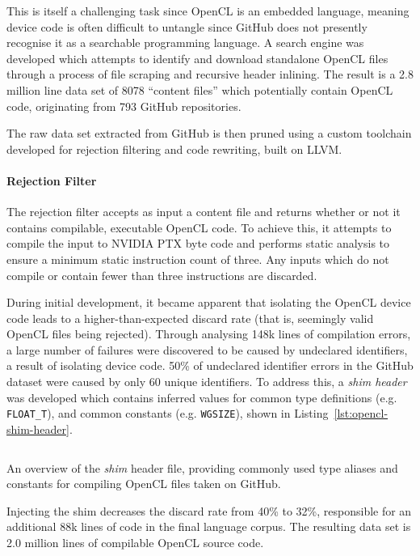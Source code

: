 This is itself a challenging task since OpenCL is an embedded language, meaning device code is often difficult to untangle since GitHub does not presently recognise it as a searchable programming language. A search engine was developed which attempts to identify and download standalone OpenCL files through a process of file scraping and recursive header inlining. The result is a 2.8 million line data set of 8078 ``content files'' which potentially contain OpenCL code, originating from 793 GitHub repositories.

The raw data set extracted from GitHub is then pruned using a custom toolchain developed for rejection filtering and code rewriting, built on LLVM.


\paragraph*{Rejection Filter}
\label{subsubsec:opencl-rejection-filter}

The rejection filter accepts as input a content file and returns whether or not it contains compilable, executable OpenCL code. To achieve this, it attempts to compile the input to NVIDIA PTX byte code and performs static analysis to ensure a minimum static instruction count of three. Any inputs which do not compile or contain fewer than three instructions are discarded.

During initial development, it became apparent that isolating the OpenCL device code leads to a higher-than-expected discard rate (that is, seemingly valid OpenCL files being rejected). Through analysing 148k lines of compilation errors, a large number of failures were discovered to be caused by undeclared identifiers, a result of isolating device code. 50\% of undeclared identifier errors in the GitHub dataset were caused by only 60 unique identifiers. To address this, a \emph{shim header} was developed which contains inferred values for common type definitions (e.g. \texttt{FLOAT\_T}), and common constants (e.g. \texttt{WGSIZE}), shown in Listing~\ref{lst:opencl-shim-header}.

\begin{listing}
\inputminted{c}{lst/opencl-shim-header.h}
\caption[The \emph{shim} header file for compiling OpenCL from GitHub]{An overview of the \emph{shim} header file, providing commonly used type aliases and constants for compiling OpenCL files taken on GitHub.}
\label{lst:opencl-shim-header}
\end{listing}

Injecting the shim decreases the discard rate from 40\% to 32\%, responsible for an additional 88k lines of code in the final language corpus. The resulting data set is 2.0 million lines of compilable OpenCL source code.


